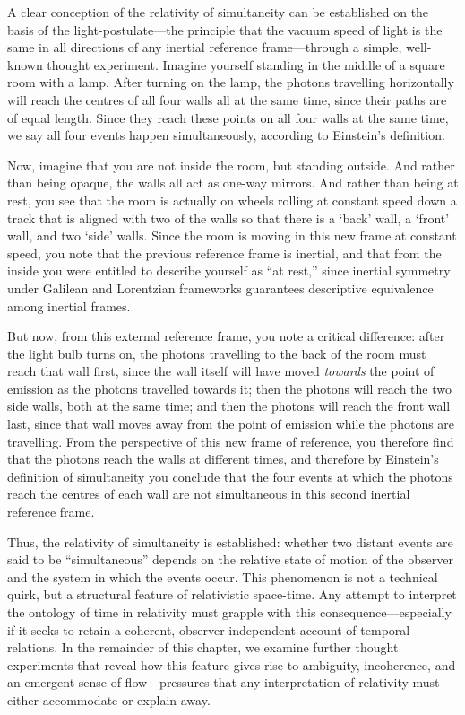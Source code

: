 \documentclass[12pt]{book}
\begin{document}
\vspace{4pt}

A clear conception of the relativity of simultaneity can be established on the basis of the light-postulate---the principle that the vacuum speed of light is the same in all directions of any inertial reference frame---through a simple, well-known thought experiment. Imagine yourself standing in the middle of a square room with a lamp. After turning on the lamp, the photons travelling horizontally will reach the centres of all four walls all at the same time, since their paths are of equal length. Since they reach these points on all four walls at the same time, we say all four events happen simultaneously, according to Einstein's definition. 

Now, imagine that you are not inside the room, but standing outside. And rather than being opaque, the walls all act as one-way mirrors. And rather than being at rest, you see that the room is actually on wheels rolling at constant speed down a track that is aligned with two of the walls so that there is a `back' wall, a `front' wall, and two `side' walls. Since the room is moving in this new frame at constant speed, you note that the previous reference frame is inertial, and that from the inside you were entitled to describe yourself as ``at rest,'' since inertial symmetry under Galilean and Lorentzian frameworks guarantees descriptive equivalence among inertial frames.

But now, from this external reference frame, you note a critical difference: after the light bulb turns on, the photons travelling to the back of the room must reach that wall first, since the wall itself will have moved \textit{towards} the point of emission as the photons travelled towards it; then the photons will reach the two side walls, both at the same time; and then the photons will reach the front wall last, since that wall moves away from the point of emission while the photons are travelling. From the perspective of this new frame of reference, you therefore find that the photons reach the walls at different times, and therefore by Einstein's definition of simultaneity you conclude that the four events at which the photons reach the centres of each wall are not simultaneous in this second inertial reference frame.

Thus, the relativity of simultaneity is established: whether two distant events are said to be ``simultaneous'' depends on the relative state of motion of the observer and the system in which the events occur. This phenomenon is not a technical quirk, but a structural feature of relativistic space-time. Any attempt to interpret the ontology of time in relativity must grapple with this consequence---especially if it seeks to retain a coherent, observer-independent account of temporal relations. In the remainder of this chapter, we examine further thought experiments that reveal how this feature gives rise to ambiguity, incoherence, and an emergent sense of flow---pressures that any interpretation of relativity must either accommodate or explain away.
\end{document}
